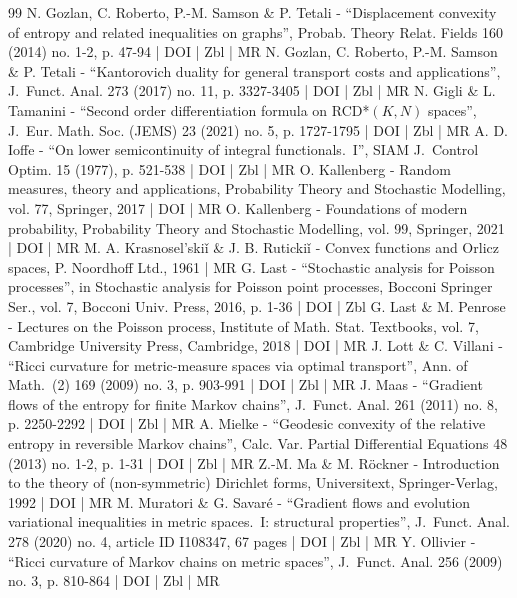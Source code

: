 \begin{thebibliography}{99}
N. Gozlan, C. Roberto, P.-M. Samson \& P. Tetali - “Displacement convexity of entropy and related inequalities on graphs”, Probab. Theory Relat. Fields 160 (2014) no. 1-2, p. 47-94 | DOI | Zbl | MR
N. Gozlan, C. Roberto, P.-M. Samson \& P. Tetali - “Kantorovich duality for general transport costs and applications”, J. Funct. Anal. 273 (2017) no. 11, p. 3327-3405 | DOI | Zbl | MR
N. Gigli \& L. Tamanini - “Second order differentiation formula on RCD*$(K,N)$ spaces”, J. Eur. Math. Soc. (JEMS) 23 (2021) no. 5, p. 1727-1795 | DOI | Zbl | MR
A. D. Ioffe - “On lower semicontinuity of integral functionals. I”, SIAM J. Control Optim. 15 (1977), p. 521-538 | DOI | Zbl | MR
O. Kallenberg - Random measures, theory and applications, Probability Theory and Stochastic Modelling, vol. 77, Springer, 2017 | DOI | MR
O. Kallenberg - Foundations of modern probability, Probability Theory and Stochastic Modelling, vol. 99, Springer, 2021 | DOI | MR
M. A. Krasnosel’skiǐ \& J. B. Rutickiǐ - Convex functions and Orlicz spaces, P. Noordhoff Ltd., 1961 | MR
G. Last - “Stochastic analysis for Poisson processes”, in Stochastic analysis for Poisson point processes, Bocconi Springer Ser., vol. 7, Bocconi Univ. Press, 2016, p. 1-36 | DOI | Zbl
G. Last \& M. Penrose - Lectures on the Poisson process, Institute of Math. Stat. Textbooks, vol. 7, Cambridge University Press, Cambridge, 2018 | DOI | MR
J. Lott \& C. Villani - “Ricci curvature for metric-measure spaces via optimal transport”, Ann. of Math. (2) 169 (2009) no. 3, p. 903-991 | DOI | Zbl | MR
J. Maas - “Gradient flows of the entropy for finite Markov chains”, J. Funct. Anal. 261 (2011) no. 8, p. 2250-2292 | DOI | Zbl | MR
A. Mielke - “Geodesic convexity of the relative entropy in reversible Markov chains”, Calc. Var. Partial Differential Equations 48 (2013) no. 1-2, p. 1-31 | DOI | Zbl | MR
Z.-M. Ma \& M. Röckner - Introduction to the theory of (non-symmetric) Dirichlet forms, Universitext, Springer-Verlag, 1992 | DOI | MR
M. Muratori \& G. Savaré - “Gradient flows and evolution variational inequalities in metric spaces. I: structural properties”, J. Funct. Anal. 278 (2020) no. 4, article ID I108347, 67 pages | DOI | Zbl | MR
Y. Ollivier - “Ricci curvature of Markov chains on metric spaces”, J. Funct. Anal. 256 (2009) no. 3, p. 810-864 | DOI | Zbl | MR

\end{thebibliography}
